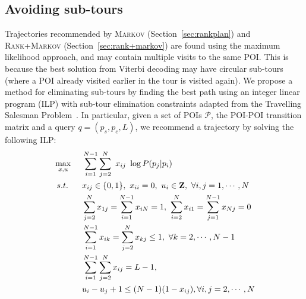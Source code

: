 \subsection{Avoiding sub-tours} %
\label{sec:nosubtour}

Trajectories recommended by \textsc{Markov} (Section~\ref{sec:rankplan}) and \textsc{Rank+Markov} (Section~\ref{sec:rank+markov})
are found using the maximum likelihood approach, and may contain multiple visits to the same POI.
This is because the best solution from Viterbi decoding %
may have
circular sub-tours (where a POI already visited earlier in the tour is visited again).
We propose a method for eliminating sub-tours by %
%
finding the best path using an integer linear program (ILP) with
sub-tour elimination constraints adapted from the Travelling Salesman Problem~\cite{opt98}.
In particular, given a set of POIs $\mathcal{P}$, the POI-POI transition matrix and a query $q = (p_s, p_e, L)$,
we recommend a trajectory by solving the following ILP:
\eqmoveup
\begin{alignat}{5}
\eqmoveup
& \max_{x,u}  ~&& \sum_{i=1}^{N-1} \sum_{j=2}^N ~x_{ij} ~\log P(p_j | p_i)                                                 \nonumber \\
& ~s.t. ~&& x_{ij} \in \{0, 1\}, ~x_{ii} = 0, ~u_i \in \mathbf{Z}, ~\forall i, j = 1, \cdots, N                    \label{eq:cons1} \\
&        && \sum_{j=2}^N x_{1j} = \sum_{i=1}^{N-1} x_{iN} = 1, ~\sum_{i=2}^N x_{i1} = \sum_{j=1}^{N-1} x_{Nj} = 0  \label{eq:cons2} \\
&        && \sum_{i=1}^{N-1} x_{ik} = \sum_{j=2}^N x_{kj} \le 1,   ~\forall k=2, \cdots, N-1                       \label{eq:cons3} \\
&        && \sum_{i=1}^{N-1} \sum_{j=2}^N x_{ij} = L-1,                                                            \label{eq:cons4} \\
&        && u_i - u_j + 1 \le (N-1) (1-x_{ij}),                     \forall i, j = 2, \cdots, N                    \label{eq:cons5}
\end{alignat}
